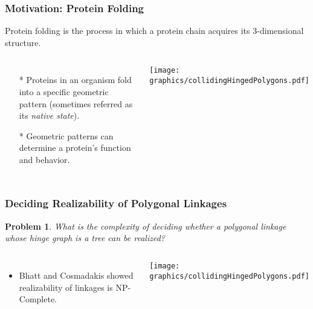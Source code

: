 \documentclass{beamer}
\newtheorem{prob}{Problem}
\begin{document}
\begin{frame}
  \frametitle{Motivation: Protein Folding}
  Protein folding is the process in which a protein chain acquires its 3-dimensional structure.
  \begin{columns}[c] %
   \begin{itemize}
    \item[*] Proteins in an organism fold into a specific geometric pattern (sometimes referred as its \textit{native state}).
    \item[*]  Geometric patterns can determine a protein's function and behavior.
   \end{itemize}
     \begin{minipage}{\linewidth}
        \begin{center}
        \texttt{[image: graphics/collidingHingedPolygons.pdf]}
        \end{center} 
  \end{minipage}
  \end{columns}
\end{frame}

\begin{frame}
\frametitle{Deciding Realizability of Polygonal Linkages}
\begin{prob}
What is the complexity of deciding whether a polygonal linkage whose hinge graph is a \textit{tree} can be realized?
\end{prob}
\begin{columns}[c] %
   \begin{itemize}
    \item Bhatt and Cosmadakis showed realizability of linkages is NP-Complete.
   \end{itemize}
    \begin{minipage}{\linewidth}
        \begin{center}
            \texttt{[image: graphics/collidingHingedPolygons.pdf]}
        \end{center} 
    \end{minipage}
  \end{columns}
\end{frame}
\end{document}

